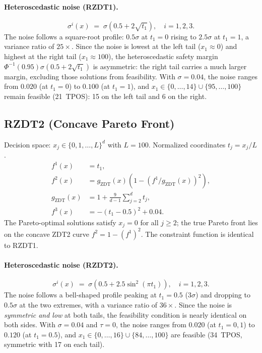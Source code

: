 \documentclass[12pt]{article}
\theoremstyle{plain}
\theoremstyle{definition}
\theoremstyle{remark}
\begin{document}
\paragraph{Heteroscedastic noise (RZDT1).}
\begin{equation}\label{eq:het_rzdt1}
  \sigma^i(x) \;=\; \sigma\!\left(0.5 + 2\sqrt{t_1}\right),
  \quad i=1,2,3.
\end{equation}
The noise follows a square-root profile: $0.5\sigma$ at $t_1=0$ rising to
$2.5\sigma$ at $t_1=1$, a variance ratio of $25\times$.  Since the noise
is lowest at the left tail ($x_1 \approx 0$) and highest at the right
tail ($x_1 \approx 100$), the heteroscedastic safety margin
$\Phi^{-1}(0.95)\sigma(0.5+2\sqrt{t_1})$ is asymmetric: the right tail
carries a much larger margin, excluding those solutions from feasibility.
With $\sigma=0.04$, the noise ranges from $0.020$ (at $t_1=0$) to
$0.100$ (at $t_1=1$), and
$x_1 \in \{0,\ldots,14\} \cup \{95,\ldots,100\}$ remain feasible
(21~TPOS): 15 on the left tail and 6 on the right.


\subsection{RZDT2 (Concave Pareto Front)}\label{app:rzdt2}

Decision space: $x_j \in \{0, 1, \ldots, L\}^d$ with $L = 100$.
Normalized coordinates $t_j = x_j / L$.
\begin{align*}
  f^1(x) &= t_1, \\
  f^2(x) &= g_{\mathrm{ZDT}}(x)\!\left(1 - (f^1/g_{\mathrm{ZDT}}(x))^2\right), \\
  g_{\mathrm{ZDT}}(x)   &= 1 + \frac{9}{d-1}\sum_{j=2}^{d} t_j, \\
  f^3(x) &= -(t_1 - 0.5)^2 + 0.04.
\end{align*}
The Pareto-optimal solutions satisfy $x_j=0$ for all $j\ge2$;
the true Pareto front lies on the concave ZDT2 curve $f^2 = 1-(f^1)^2$.
The constraint function is identical to RZDT1.

\paragraph{Heteroscedastic noise (RZDT2).}
\begin{equation}\label{eq:het_rzdt2}
  \sigma^i(x) \;=\; \sigma\!\left(0.5 + 2.5\sin^2(\pi t_1)\right),
  \quad i=1,2,3.
\end{equation}
The noise follows a bell-shaped profile peaking at $t_1=0.5$ ($3\sigma$)
and dropping to $0.5\sigma$ at the two extremes, with a variance ratio
of $36\times$.  Since the noise is \emph{symmetric and low} at both tails,
the feasibility condition is nearly identical on both sides.
With $\sigma=0.04$ and $\tau=0$, the noise ranges from $0.020$ (at
$t_1=0,1$) to $0.120$ (at $t_1=0.5$), and
$x_1 \in \{0,\ldots,16\} \cup \{84,\ldots,100\}$ are feasible (34~TPOS,
symmetric with 17 on each tail).
\end{document}
